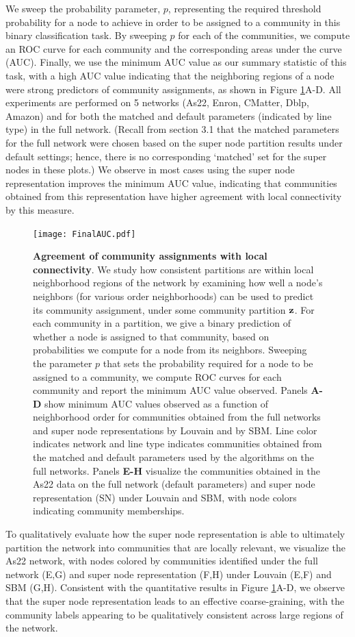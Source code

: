 We sweep the probability parameter, $p$, representing the required threshold probability for a node to achieve in order to be assigned to a community in this binary classification task. By sweeping $p$ for each of the communities, we compute an ROC curve for each community and the corresponding areas under the curve (AUC). Finally, we use the minimum AUC value as our summary statistic of this task, with a high AUC value indicating that the neighboring regions of a node were strong predictors of community assignments, as shown in Figure \ref{Viz}A-D. All experiments are performed on 5 networks (As22, Enron, CMatter, Dblp, Amazon) and for both the matched and default parameters (indicated by line type) in the full network. (Recall from section 3.1 that the matched parameters for the full network were chosen based on the super node partition results under default settings; hence, there is no corresponding `matched' set for the super nodes in these plots.) We observe in most cases using the super node representation improves the minimum AUC value, indicating that communities obtained from this representation have higher agreement with local connectivity by this measure.
\begin{figure}
\centering
\texttt{[image: FinalAUC.pdf]}
\caption{{\bf Agreement of community assignments with local connectivity}. We study how  consistent partitions are within local neighborhood regions of the network by examining how well a node's neighbors (for various order neighborhoods) can be used to predict its community assignment, under some community partition ${\bf z}$. For each community in a partition, we give a binary prediction of whether a node is assigned to that community, based on probabilities we compute for a node from its neighbors. Sweeping the parameter $p$ that sets the probability required for a node to be assigned to a community, we compute ROC curves for each community and report the minimum AUC value observed. Panels {\bf A-D} show minimum AUC values observed as a function of neighborhood order for communities obtained from the full networks and super node representations by Louvain and by SBM. Line color indicates network and line type indicates communities obtained from the matched and default parameters used by the algorithms on the full networks. Panels {\bf E-H} visualize the communities obtained in the As22 data on the full network (default parameters) and super node representation (SN) under Louvain and SBM, with node colors indicating community memberships. }
\label{Viz}
\end{figure}
To qualitatively evaluate how the super node representation is able to ultimately partition the network into communities that are locally relevant, we visualize the As22 network, with nodes colored by communities identified under the full network (E,G) and super node representation (F,H) under Louvain (E,F) and SBM (G,H). Consistent with the quantitative results in Figure \ref{Viz}A-D, we observe that the super node representation leads to an effective coarse-graining, with the community labels appearing to be qualitatively consistent across large regions of the network.

